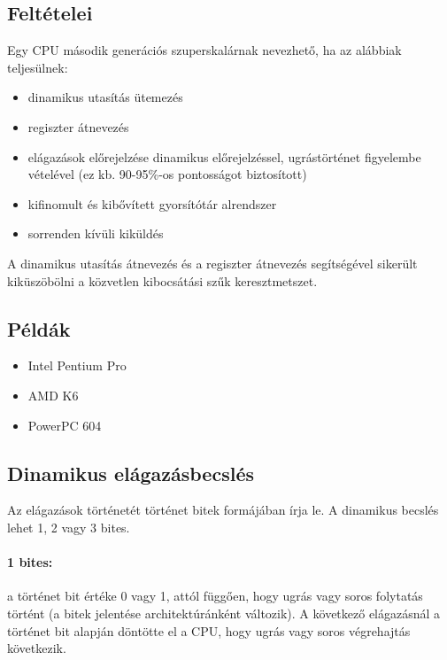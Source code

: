 \subsection{Feltételei}
Egy CPU második generációs szuperskalárnak nevezhető, ha az alábbiak teljesülnek:
\begin{itemize}
    \item dinamikus utasítás ütemezés
    \item regiszter átnevezés
    \item elágazások előrejelzése dinamikus előrejelzéssel, ugrástörténet figyelembe vételével (ez kb. 90-95\%-os pontosságot biztosított)
    \item kifinomult és kibővített gyorsítótár alrendszer
    \item sorrenden kívüli kiküldés
\end{itemize}
A dinamikus utasítás átnevezés és a regiszter átnevezés segítségével sikerült kiküszöbölni a közvetlen kibocsátási szűk keresztmetszet.

\subsection{Példák}
\begin{itemize}
    \item Intel Pentium Pro
    \item AMD K6
    \item PowerPC 604
\end{itemize}

\subsection{Dinamikus elágazásbecslés}
Az elágazások történetét történet bitek formájában írja le. A dinamikus becslés lehet 1, 2 vagy 3 bites.
\paragraph{1 bites:} a történet bit értéke 0 vagy 1, attól függően, hogy ugrás vagy soros folytatás történt (a bitek jelentése architektúránként változik).
A következő elágazásnál a történet bit alapján döntötte el a CPU, hogy ugrás vagy soros végrehajtás következik.
